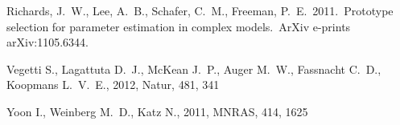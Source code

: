 \documentclass[letterpaper, 11pt]{article}
\begin{document}
\begin{thebibliography}{99}
 Richards, J.~W., Lee, 
A.~B., Schafer, C.~M., Freeman, P.~E.\ 2011.\ Prototype selection for 
parameter estimation in complex models.\ ArXiv e-prints arXiv:1105.6344. 

 Vegetti S., Lagattuta D.~J., McKean J.~P., 
Auger M.~W., Fassnacht C.~D., Koopmans L.~V.~E., 2012, Natur, 481, 341 

 Yoon I., Weinberg M.~D., Katz N., 2011, MNRAS, 414, 1625 
\end{thebibliography}
\end{document}
